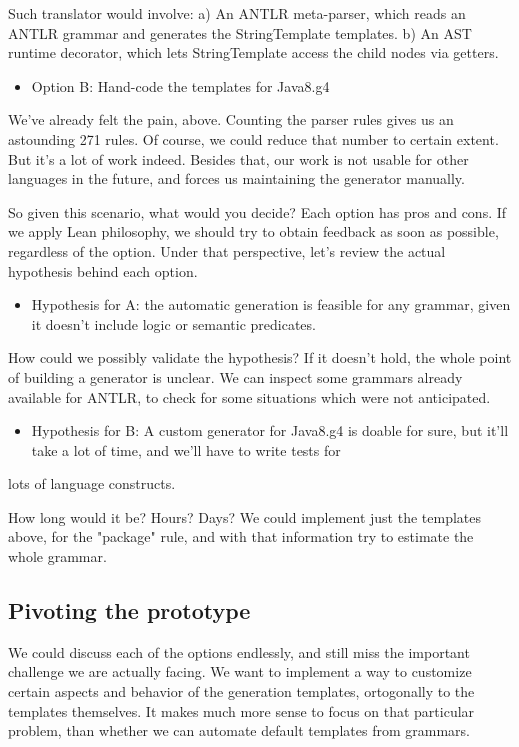 \documentclass[11pt]{article}
\begin{document}
Such translator would involve:
a) An ANTLR meta-parser, which reads an ANTLR grammar and generates the StringTemplate templates.
b) An AST runtime decorator, which lets StringTemplate access the child nodes via getters.

\begin{itemize}
\item Option B: Hand-code the templates for Java8.g4
\end{itemize}

We've already felt the pain, above. Counting the parser rules gives us an astounding 271 rules. Of course, we could
reduce that number to certain extent. But it's a lot of work indeed. Besides that, our work is not usable for other languages
in the future, and forces us maintaining the generator manually.

So given this scenario, what would you decide? Each option has pros and cons. If we apply Lean philosophy, we should try to
obtain feedback as soon as possible, regardless of the option. Under that perspective, let's review the actual hypothesis behind
each option.

\begin{itemize}
\item Hypothesis for A: the automatic generation is feasible for any grammar, given it doesn't include logic or semantic predicates.
\end{itemize}

How could we possibly validate the hypothesis? If it doesn't hold, the whole point of building a generator is unclear. We can inspect
some grammars already available for ANTLR, to check for some situations which were not anticipated.

\begin{itemize}
\item Hypothesis for B: A custom generator for Java8.g4 is doable for sure, but it'll take a lot of time, and we'll have to write tests for
\end{itemize}
lots of language constructs.

How long would it be? Hours? Days? We could implement just the templates above, for the "package" rule, and with that information
try to estimate the whole grammar.

\subsection{Pivoting the prototype}
\label{sec-1-4}

We could discuss each of the options endlessly, and still miss the important challenge we are actually facing. We want to implement
a way to customize certain aspects and behavior of the generation templates, ortogonally to the templates themselves. It makes
much more sense to focus on that particular problem, than whether we can automate default templates from grammars.
\end{document}
